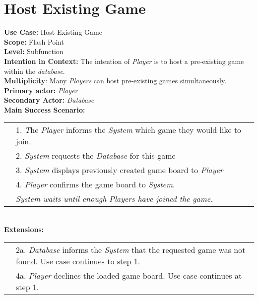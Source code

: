 \documentclass{article}
\begin{document}
	\section*{Host Existing Game}
	\textbf{Use Case:} Host Existing Game\\
	\textbf{Scope:} Flash Point\\
	\textbf{Level:} Subfunction\\
	\textbf{Intention in Context:} The intention of \textit{Player} is to host a pre-existing game within the \textit{database}.\\
	\textbf{Multiplicity}: Many \textit{Players} can host pre-existing games simultaneously.\\
	\textbf{Primary actor:} \textit{Player}\\
	\textbf{Secondary Actor:} \textit{Database}\\
	\textbf{Main Success Scenario:}\\
	\begin{tabular}{l l}
		&1. \textit The \textit{Player} informs the \textit{System} which game they would like to join.\\
		&2. \textit{System} requests the \textit{Database} for this game\\
		&3. \textit{System} displays previously created game board to \textit{Player}\\
		&4. \textit{Player} confirms the game board to \textit{System}.\\
		&\qquad\textit{System waits until enough Players have joined the game.}
	\end{tabular}\\
	\textbf{Extensions:}\\
	\begin{tabular}{l l}
		&2a. \textit{Database} informs the \textit{System} that the requested game was not found. Use case continues to step 1.\\
		&4a. \textit{Player} declines the loaded game board. Use case continues at step 1.
	\end{tabular}
\end{document}
